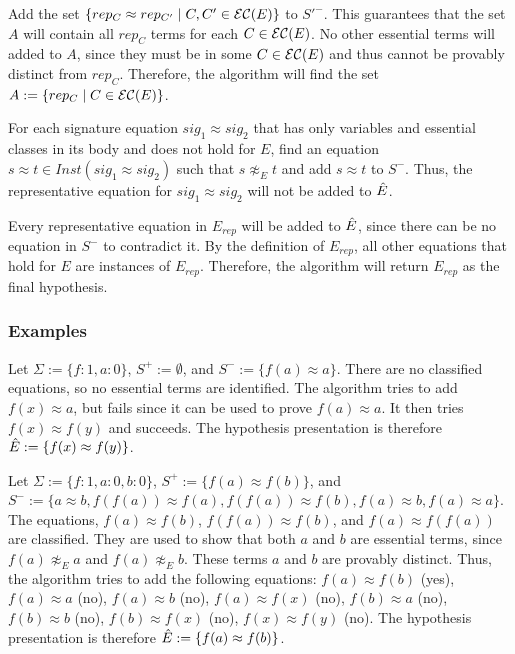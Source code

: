 Add the set $\{ rep_C \approx rep_{C'} \; | \; C,C' \in {\mathcal{E}\mathcal{C}}(E) \}$ to $S'^-$.
This guarantees that the set $A$ will contain all $rep_C$ terms for each $C \in {\mathcal{E}\mathcal{C}}(E)$.
No other essential terms will added to $A$, since they must be in some $C \in {\mathcal{E}\mathcal{C}}(E)$ and thus cannot be provably distinct from $rep_C$.
Therefore, the algorithm will find the set $A := \{ rep_C \; | \; C \in {\mathcal{E}\mathcal{C}}(E) \}$.

For each signature equation $sig_1 \approx sig_2$ that has only variables and essential classes in its body and does not hold for $E$, find an equation $s \approx t \in Inst(sig_1 \approx sig_2)$ such that $s \not\approx_E t$ and add $s \approx t$ to $S^-$.
Thus, the representative equation for $sig_1 \approx sig_2$ will not be added to $\ahat{E}$.

Every representative equation in $E_{rep}$ will be added to $\ahat{E}$, since there can be no equation in $S^-$ to contradict it.
By the definition of $E_{rep}$, all other equations that hold for $E$ are instances of $E_{rep}$. 
Therefore, the algorithm will return $E_{rep}$ as the final hypothesis.


\subsubsection{Examples}

\begin{example}
Let $\Sigma := \{ f:1, a:0 \}$, $S^+ := \emptyset$, and $S^- := \{ f(a) \approx a \}$. 
There are no classified equations, so no essential terms are identified.
The algorithm tries to add $f(x) \approx a$, but fails since it can be used to prove $f(a) \approx a$.
It then tries $f(x) \approx f(y)$ and succeeds. 
The hypothesis presentation is therefore $\ahat{E} := \{ f(x) \approx f(y) \}$.
\end{example}

\begin{example}
Let $\Sigma := \{ f:1, a:0, b:0 \} $,  $S^+ := \{ f(a) \approx f(b) \}$, and $S^- := \{ a\approx b, f(f(a))\approx f(a), f(f(a))\approx f(b), f(a)\approx b, f(a)\approx a \}$. 
The equations, $f(a)\approx f(b)$, $f(f(a))\approx f(b)$, and $f(a) \approx f(f(a))$ are classified.
They are used to show that both $a$ and $b$ are essential terms, since $f(a) \not\approx_E a$ and $f(a) \not\approx_E b$.
These terms $a$ and $b$ are provably distinct.
Thus, the algorithm tries to add the following equations: $f(a) \approx f(b)$ (yes), $f(a) \approx a$ (no), $f(a) \approx b$ (no), $f(a) \approx f(x)$ (no), $f(b) \approx a$ (no), $f(b) \approx b$ (no), $f(b) \approx f(x)$ (no), $f(x) \approx f(y)$ (no).
The hypothesis presentation is therefore $\ahat{E} := \{f(a) \approx f(b) \}$.
\end{example}